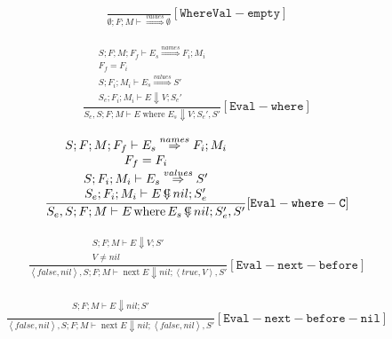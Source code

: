 \documentclass{scrartcl}
\DeclareMathOperator{\where}{where}
\DeclareMathOperator{\nextop}{next}
\DeclareMathOperator{\ceval}{\overset{C}{\smash{\Downarrow}}}
\begin{document}
    \begin{align*}
    \frac{}{
        \emptyset; F; M \vdash \overset{values}{\Rightarrow} \emptyset
    }[\mathtt{WhereVal-empty}]
    \end{align*}
    
    \begin{align*}
    \frac{
        \begin{matrix}
        S; F; M; F_f \vdash E_s \overset{names}{\Rightarrow} F_i; M_i \\
        F_f = F_i \\
        S; F_i; M_i \vdash E_s \overset{values}{\Rightarrow} S' \\
        S_e; F_i; M_i \vdash E \Downarrow V; S_e'        
        \end{matrix}
    }{
        S_e, S; F; M \vdash E \where E_s \Downarrow V; S_e', S'
    }[\mathtt{Eval-where}]
    \end{align*}
    
    \begin{align*}
    \frac{
        \begin{matrix}
        S; F; M; F_f \vdash E_s \overset{names}{\Rightarrow} F_i; M_i \\
        F_f = F_i \\
        S; F_i; M_i \vdash E_s \overset{values}{\Rightarrow} S' \\
        S_e; F_i; M_i \vdash E  \ceval nil; S_e'        
        \end{matrix}
    }{
        S_e, S; F; M \vdash E \where E_s \ceval nil; S_e', S'
    }[\mathtt{Eval-where-C}]
    \end{align*}
   
    
    \begin{align*}
    \frac{
        \begin{matrix}
        S; F; M \vdash E \Downarrow V; S' \\
        V \neq nil
        \end{matrix}
    }{
        \left<false, nil \right>, S; F; M \vdash \nextop E \Downarrow nil; \left< true, V \right>, S'
    }[\mathtt{Eval-next-before}]
    \end{align*}
    
    \begin{align*}
    \frac{
        \begin{matrix}
        S; F; M \vdash E \Downarrow nil; S' \\
        \end{matrix}
    }{
        \left<false, nil \right>, S; F; M \vdash \nextop E \Downarrow nil; \left< false, nil \right>, S'
    }[\mathtt{Eval-next-before-nil}]
    \end{align*}
    
\end{document}
